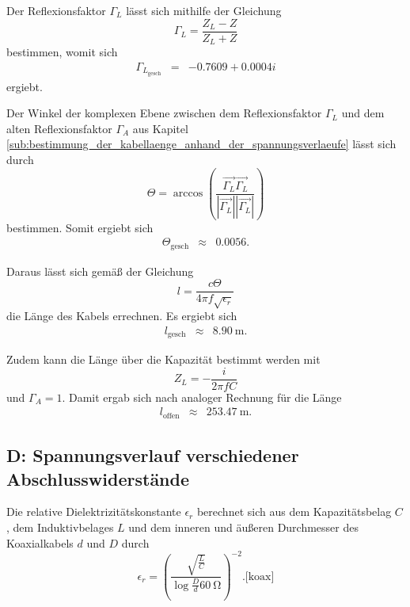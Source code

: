 Der Reflexionsfaktor $\Gamma_L$ lässt sich mithilfe der Gleichung
\begin{equation}
	\Gamma_L = \frac{Z_L-Z}{Z_L+Z}
\end{equation}
bestimmen, womit sich
\begin{eqnarray}
	\Gamma_{L_\text{gesch}} &=& -0.7609 + 0.0004i
\end{eqnarray}
ergiebt.

Der Winkel der komplexen Ebene zwischen dem Reflexionsfaktor $\Gamma_L$ und dem alten Reflexionsfaktor $\Gamma_A$ aus Kapitel \ref{sub:bestimmung_der_kabellaenge_anhand_der_spannungsverlaeufe} lässt sich durch
\begin{equation}
	\Theta = \arccos \left(\frac{\vec{\Gamma_L}\vec{\Gamma_L}}{|\vec{\Gamma_L}||\vec{\Gamma_L}|}\right)
\end{equation}
bestimmen.
Somit ergiebt sich
\begin{eqnarray}
	\Theta_\text{gesch} &\approx& 0.0056.
\end{eqnarray}

Daraus lässt sich gemäß der Gleichung
\begin{equation}
	l = \frac{c \Theta}{4 \pi f \sqrt{\epsilon_r}}
\end{equation}
die Länge des Kabels errechnen.
Es ergiebt sich
\begin{eqnarray}
	l_\text{gesch} &\approx& \SI{8.90}{\meter}.
\end{eqnarray}

Zudem kann die Länge über die Kapazität bestimmt werden mit
\begin{equation}
	Z_L = -\frac{i}{2 \pi f C}
\end{equation}
und $\Gamma_A = 1$.
Damit ergab sich nach analoger Rechnung für die Länge
\begin{eqnarray}
	l_\text{offen} &\approx& \SI{253.47}{\meter}.
\end{eqnarray}

\FloatBarrier
\subsection{D: Spannungsverlauf verschiedener Abschlusswiderstände} %
\label{sub:spannungsverlauf_verschiedener_abschlusswiderstaende}

Die relative Dielektrizitätskonstante $\epsilon_r$ berechnet sich aus dem Kapazitätsbelag $C$, dem Induktivbelages $L$ und dem inneren und äußeren Durchmesser des Koaxialkabels $d$ und $D$ durch
\begin{equation}
	\epsilon_r = \left(\frac{\sqrt{\frac{L}{C}}}{\log{\frac{D}{d}} \SI{60}{\ohm}}\right)^{-2}. \text{[koax]} 
\end{equation}

